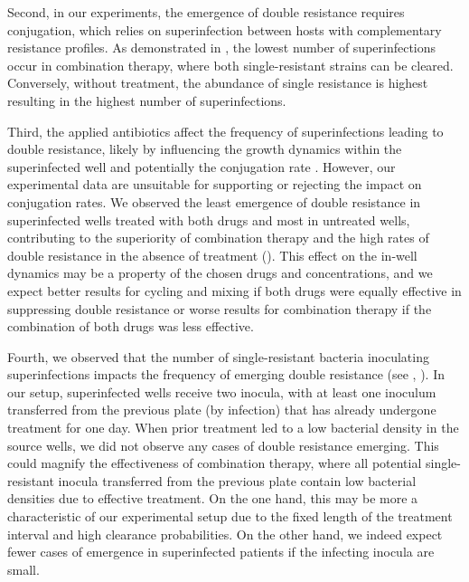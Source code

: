 Second, in our experiments, the emergence of double resistance requires conjugation, which relies on superinfection between hosts with complementary resistance profiles.
As demonstrated in , the lowest number of superinfections occur in combination therapy, where both single-resistant strains can be cleared. 
Conversely, without treatment, the abundance of single resistance is highest resulting in the highest number of superinfections.

Third, the applied antibiotics affect the frequency of superinfections leading to double resistance, likely by influencing the growth dynamics within the superinfected well and potentially the conjugation rate \cite{Headd2018}. 
However, our experimental data are unsuitable for supporting or rejecting the impact on conjugation rates.
We observed the least emergence of double resistance in superinfected wells treated with both drugs and most in untreated wells, contributing to the superiority of combination therapy and the high rates of double resistance in the absence of treatment ().
This effect on the in-well dynamics may be a property of the chosen drugs and concentrations, and we expect better results for cycling and mixing if both drugs were equally effective in suppressing double resistance or worse results for combination therapy if the combination of both drugs was less effective.

Fourth, we observed that the number of single-resistant bacteria inoculating superinfections impacts the frequency of emerging double resistance (see , ). 
In our setup, superinfected wells receive two inocula, with at least one inoculum transferred from the previous plate (by infection) that has already undergone treatment for one day. 
When prior treatment led to a low bacterial density in the source wells, we did not observe any cases of double resistance emerging.
This could magnify the effectiveness of combination therapy, where all potential single-resistant inocula transferred from the previous plate contain low bacterial densities due to effective treatment. 
On the one hand, this may be more a characteristic of our experimental setup due to the fixed length of the treatment interval and high clearance probabilities. 
On the other hand, we indeed expect fewer cases of emergence in superinfected patients if the infecting inocula are small.

